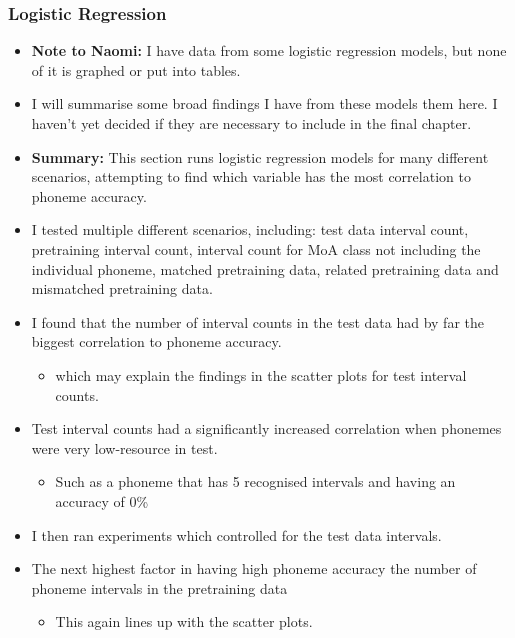 \subsubsection{Logistic Regression}
\begin{itemize}
    \item \textbf{Note to Naomi:} I have data from some logistic regression models, but none of it is graphed or put into tables.
    \item I will summarise some broad findings I have from these models them here. I haven't yet decided if they are necessary to include in the final chapter.
    \item \textbf{Summary:} This section runs logistic regression models for many different scenarios, attempting to find which variable has the most correlation to phoneme accuracy.
    \item I tested multiple different scenarios, including: test data interval count, pretraining interval count, interval count for MoA class not including the individual phoneme, matched pretraining data, related pretraining data and mismatched pretraining data.
    \item I found that the number of interval counts in the test data had by far the biggest correlation to phoneme accuracy.
    \begin{itemize}
        \item which may explain the findings in the scatter plots for test interval counts.
    \end{itemize}
    \item Test interval counts had a significantly increased correlation when phonemes were very low-resource in test.
    \begin{itemize}
        \item Such as a phoneme that has 5 recognised intervals and having an accuracy of 0\%
    \end{itemize}
    \item I then ran experiments which controlled for the test data intervals.
    \item The next highest factor in having high phoneme accuracy the number of phoneme intervals in the pretraining data
    \begin{itemize}
        \item This again lines up with the scatter plots.
    \end{itemize}
    

\end{itemize}
